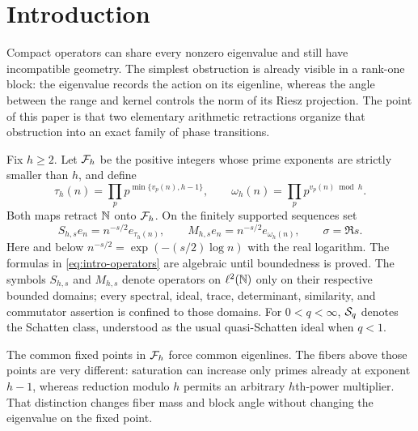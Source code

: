 \section{Introduction}
\label{sec:introduction}

Compact operators can share every nonzero eigenvalue and still have
incompatible geometry.  The simplest obstruction is already visible in a
rank-one block: the eigenvalue records the action on its eigenline, whereas
the angle between the range and kernel controls the norm of its Riesz
projection.  The point of this paper is that two elementary arithmetic
retractions organize that obstruction into an exact family of phase
transitions.

Fix $h\ge2$.  Let $\mathcal F_h$ be the positive integers whose prime exponents are
strictly smaller than $h$, and define
\begin{equation}
  \tau_h(n)=\prod_p p^{\min\{v_p(n),h-1\}},
  \qquad
  \omega_h(n)=\prod_p p^{v_p(n)\bmod h}.
  \label{eq:intro-maps}
\end{equation}
Both maps retract $\mathbb N$ onto $\mathcal F_h$.  On the finitely supported sequences set
\begin{equation}
  S_{h,s}e_n=n^{-s/2}e_{\tau_h(n)},
  \qquad
  M_{h,s}e_n=n^{-s/2}e_{\omega_h(n)},
  \qquad \sigma=\Re s.
  \label{eq:intro-operators}
\end{equation}
Here and below $n^{-s/2}=\exp(-(s/2)\log n)$ with the real logarithm.
The formulas in \cref{eq:intro-operators} are algebraic until boundedness is
proved.  The symbols $S_{h,s}$ and $M_{h,s}$ denote operators on
$\ell^2(\mathbb N)$ only on their respective bounded domains; every spectral,
ideal, trace, determinant, similarity, and commutator assertion is confined
to those domains.  For $0<q<\infty$, $\mathcal S_q$ denotes the Schatten class,
understood as the usual quasi-Schatten ideal when $q<1$.

The common fixed points in $\mathcal F_h$ force common eigenlines.  The fibers above
those points are very different: saturation can increase only primes already
at exponent $h-1$, whereas reduction modulo $h$ permits an arbitrary
$h$th-power multiplier.  That distinction changes fiber mass and block
angle without changing the eigenvalue on the fixed point.

